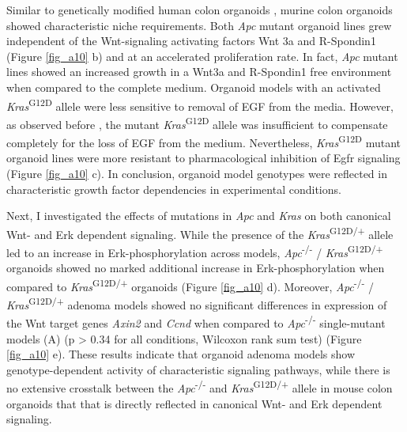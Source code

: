 \begin{flushleft}
Similar to genetically modified human colon organoids \citep{drostSequentialCancerMutations2015, matanoModelingColorectalCancer2015a}, murine colon organoids showed characteristic niche requirements. Both \textit{Apc} mutant organoid lines grew independent of the Wnt-signaling activating factors Wnt 3a and R-Spondin1 (Figure \ref{fig_a10} b) and at an accelerated proliferation rate. In fact, \textit{Apc} mutant lines showed an increased growth in a Wnt3a and R-Spondin1 free environment when compared to the complete medium. Organoid models with an activated \textit{Kras}\textsuperscript{G12D} allele were less sensitive to removal of EGF from the media. However, as observed before \citep{drostSequentialCancerMutations2015}, the mutant \textit{Kras}\textsuperscript{G12D} allele was insufficient to compensate completely for the loss of EGF from the medium. Nevertheless, \textit{Kras}\textsuperscript{G12D} mutant organoid lines were more resistant to pharmacological inhibition of Egfr signaling (Figure \ref{fig_a10} c). In conclusion, organoid model genotypes were reflected in characteristic growth factor dependencies in experimental conditions.

\bigbreak
Next, I investigated the effects of mutations in \textit{Apc} and \textit{Kras} on both canonical Wnt- and Erk dependent signaling. While the presence of the \textit{Kras}\textsuperscript{G12D/+} allele led to an increase in Erk-phosphorylation across models, \textit{Apc}\textsuperscript{-/-} / \textit{Kras}\textsuperscript{G12D/+} organoids showed no marked additional increase in Erk-phosphorylation when compared to \textit{Kras}\textsuperscript{G12D/+} organoids (Figure \ref{fig_a10} d). Moreover, \textit{Apc}\textsuperscript{-/-} / \textit{Kras}\textsuperscript{G12D/+} adenoma models showed no significant differences in expression of the Wnt target genes \textit{Axin2} and \textit{Ccnd} when compared to \textit{Apc}\textsuperscript{-/-}  single-mutant models (A) (p > 0.34 for all conditions, Wilcoxon rank sum test) (Figure \ref{fig_a10} e). These results indicate that organoid adenoma models show genotype-dependent activity of characteristic signaling pathways, while there is no extensive crosstalk between the \textit{Apc}\textsuperscript{-/-}   and \textit{Kras}\textsuperscript{G12D/+} allele in mouse colon organoids that that is directly reflected in canonical Wnt- and Erk dependent signaling.  

\bigbreak

\end{flushleft}
